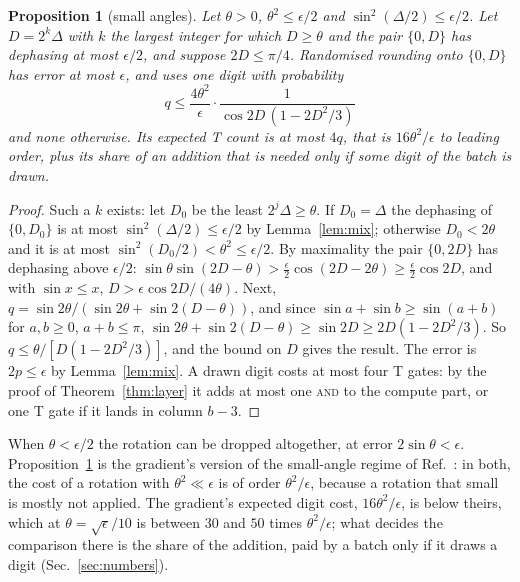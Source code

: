 \documentclass[aps,prx,twocolumn,superscriptaddress,nofootinbib,longbibliography]{revtex4-2}
\newtheorem{proposition}[theorem]{Proposition}
\theoremstyle{remark}
\newcommand{\AND}{\textup{\textsc{and}}}
\begin{document}
\begin{proposition}[small angles]\label{prop:tiny}
Let $\theta>0$, $\theta^2\le\epsilon/2$ and $\sin^2(\Delta/2)\le\epsilon/2$. Let $D=2^k\Delta$
with $k$ the largest integer for which $D\ge\theta$ and the pair $\{0,D\}$ has dephasing at most
$\epsilon/2$, and suppose $2D\le\pi/4$. Randomised rounding onto $\{0,D\}$ has error at most
$\epsilon$, and uses one digit with probability
\begin{equation}
  q\le\frac{4\theta^2}{\epsilon}\cdot\frac{1}{\cos2D\,(1-2D^2/3)}
\end{equation}
and none otherwise. Its expected T count is at most $4q$, that is $16\theta^2/\epsilon$ to
leading order, plus its share of an addition that is needed only if some digit of the batch is
drawn.
\end{proposition}

\begin{proof}
Such a $k$ exists: let $D_0$ be the least $2^j\Delta\ge\theta$. If $D_0=\Delta$ the dephasing of
$\{0,D_0\}$ is at most $\sin^2(\Delta/2)\le\epsilon/2$ by Lemma~\ref{lem:mix}; otherwise
$D_0<2\theta$ and it is at most $\sin^2(D_0/2)<\theta^2\le\epsilon/2$. By maximality the pair
$\{0,2D\}$ has dephasing above $\epsilon/2$:
$\sin\theta\sin(2D-\theta)>\tfrac\epsilon2\cos(2D-2\theta)\ge\tfrac\epsilon2\cos2D$, and with
$\sin x\le x$, $D>\epsilon\cos2D/(4\theta)$. Next, $q=\sin2\theta/(\sin2\theta+\sin2(D-\theta))$,
and since $\sin a+\sin b\ge\sin(a+b)$ for $a,b\ge0$, $a+b\le\pi$,
$\sin2\theta+\sin2(D-\theta)\ge\sin2D\ge2D(1-2D^2/3)$. So $q\le\theta/[D(1-2D^2/3)]$, and the
bound on $D$ gives the result. The error is $2p\le\epsilon$ by Lemma~\ref{lem:mix}. A drawn digit
costs at most four T gates: by the proof of Theorem~\ref{thm:layer} it adds at most one \AND{}
to the compute part, or one T gate if it lands in column $b-3$.
\end{proof}

When $\theta<\epsilon/2$ the rotation can be dropped altogether, at error $2\sin\theta<
\epsilon$. Proposition~\ref{prop:tiny} is the gradient's version of the small-angle regime of
Ref.~\cite{Bothe2026}: in both, the cost of a rotation with $\theta^2\ll\epsilon$ is of order
$\theta^2/\epsilon$, because a rotation that small is mostly not applied. The gradient's
expected digit cost, $16\theta^2/\epsilon$, is below theirs, which at $\theta=\sqrt\epsilon/10$
is between $30$ and $50$ times $\theta^2/\epsilon$; what decides the comparison there is the
share of the addition, paid by a batch only if it draws a digit (Sec.~\ref{sec:numbers}).
\end{document}
